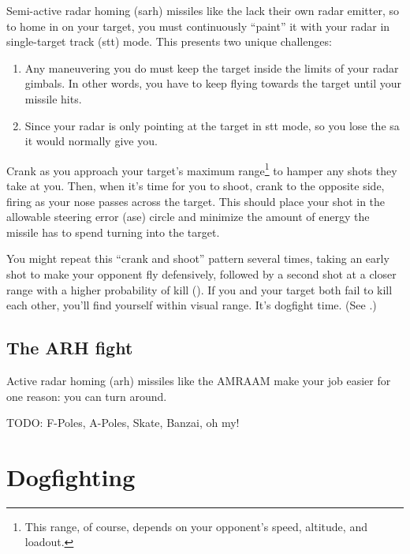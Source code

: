 Semi-active radar homing \ac{(sarh)} missiles like the 
lack their own radar emitter, so to home in on your target,
you must continuously ``paint'' it with your radar in single-target track
\ac{(stt)} mode.
This presents two unique challenges:
\begin{enumerate}
\item Any maneuvering you do must keep the target inside the limits of your radar
    gimbals. In other words,
    you have to keep flying towards the target until your missile hits.
\item Since your radar is only pointing at the target in \ac{stt} mode,
    so you lose the \ac{sa} it would normally give you.
\end{enumerate}

Crank as you approach your target's maximum range\footnote{This range,
of course, depends on your opponent's speed, altitude, and loadout.}
to hamper any shots they take at you.
Then, when it's time for you to shoot, crank to the opposite side,
firing as your nose passes across the target.
This should place your shot in the allowable steering error \ac{(ase)}
circle and minimize the amount of energy the missile has to spend turning
into the target.

You might repeat this ``crank and shoot'' pattern several times,
taking an early shot to make your opponent fly
defensively, followed by a second shot at a closer range with a higher
probability of kill ().
If you and your target both fail to kill each other,
you'll find yourself within visual range.
It's dogfight time. (See .)

\section{The ARH fight}

Active radar homing \ac{(arh)} missiles like the  AMRAAM
make your job easier for one reason: you can turn around.

TODO: F-Poles, A-Poles, Skate, Banzai, oh my!

\chapter{Dogfighting}
\label{bfm}
